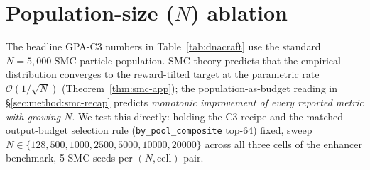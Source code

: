 \section{Population-size ($N$) ablation}\label{app:n_sweep}

The headline GPA-C3 numbers in Table~\ref{tab:dnacraft} use the standard $N\!=\!5{,}000$ SMC particle population. SMC theory predicts that the empirical distribution converges to the reward-tilted target at the parametric rate $\mathcal{O}(1/\sqrt{N})$ (Theorem~\ref{thm:smc-app}); the population-as-budget reading in \S\ref{sec:method:smc-recap} predicts \emph{monotonic improvement of every reported metric with growing $N$}. We test this directly: holding the C3 recipe and the matched-output-budget selection rule (\texttt{by\_pool\_composite} top-64) fixed, sweep $N\!\in\!\{128, 500, 1000, 2500, 5000, 10000, 20000\}$ across all three cells of the \dnacraft{} enhancer benchmark, 5 SMC seeds per $(N, \text{cell})$ pair.

